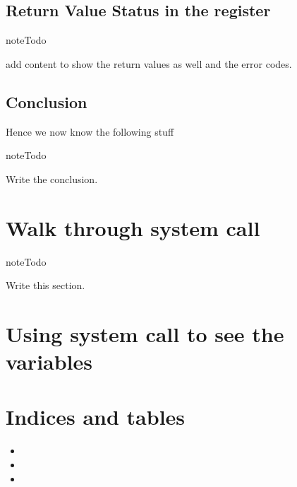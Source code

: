 \documentclass[letterpaper,10pt,english]{sphinxmanual}
\begin{document}
\section{Return Value Status in the register}
\label{\detokenize{08_return_values:return-value-status-in-the-register}}
\begin{sphinxadmonition}{note}{Todo}

add content to show the return values as well and the error codes.
\end{sphinxadmonition}


\section{Conclusion}
\label{\detokenize{08_return_values:conclusion}}
Hence we now know the following stuff

\begin{sphinxadmonition}{note}{Todo}

Write the conclusion.
\end{sphinxadmonition}


\chapter{Walk through  system call}
\label{\detokenize{11_appendix:walk-through-write-system-call}}\label{\detokenize{11_appendix::doc}}
\begin{sphinxadmonition}{note}{Todo}

Write this section.
\end{sphinxadmonition}


\chapter{Using  system call to see the variables}
\label{\detokenize{12_appendix:using-ptrace-system-call-to-see-the-variables}}\label{\detokenize{12_appendix::doc}}

\chapter{Indices and tables}
\label{\detokenize{index:indices-and-tables}}\begin{itemize}
\item {} 

\item {} 

\item {} 

\end{itemize}



\renewcommand{\indexname}{Index}
\printindex
\end{document}
